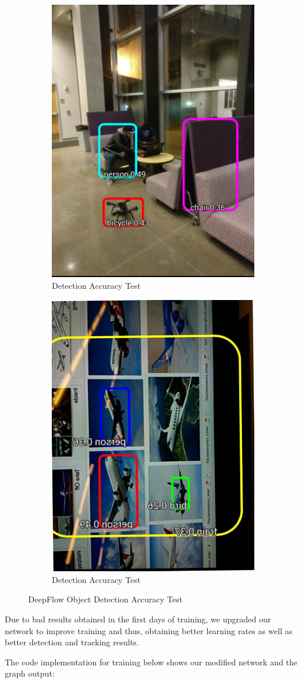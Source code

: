 \begin{figure}
\centering
\begin{subfigure}{.5\textwidth}
  \centering
  \includegraphics[width=.4\linewidth]{figures/test_2.png}
  \caption{Detection Accuracy Test}
  \label{fig:sub1}
\end{subfigure}%
\begin{subfigure}{.5\textwidth}
  \centering
  \includegraphics[width=.4\linewidth]{figures/test_7.png}
  \caption{Detection Accuracy Test}
  \label{fig:sub2}
\end{subfigure}
\caption{DeepFlow Object Detection Accuracy Test}
\label{fig:accuracy_test}
\end{figure}

\newpage
Due to  bad results obtained in the first days of training, we upgraded our network to improve training and thus, obtaining better learning rates as well as better detection and tracking results.

The code implementation for training below shows our modified network and the graph output:

